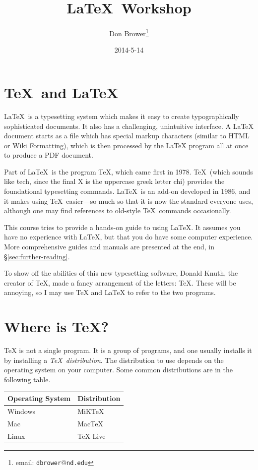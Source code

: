 \documentclass{article}
\begin{document}
\title{\LaTeX\ Workshop}
\author{Don Brower\thanks{email: \texttt{dbrower$@$nd.edu}}}
\date{2014-5-14}
\maketitle

\section{\TeX\ and \LaTeX}

\LaTeX\ is a typesetting system which makes it easy to create typographically sophisticated documents.
It also has a challenging, unintuitive interface.
A LaTeX document starts as a file which has special markup characters (similar to HTML or Wiki Formatting),
which is then processed by the LaTeX program all at once to produce a PDF document.

Part of \LaTeX\ is the program \TeX, which came first in 1978.
\TeX\ (which sounds like tech, since the final X is the uppercase greek letter chi) provides the foundational typesetting commands.
\LaTeX\ is an add-on developed in 1986, and it makes using \TeX\ easier---so much so that it
is now the standard everyone uses, although one may find references to old-style \TeX\ commands occasionally.

This course tries to provide a hands-on guide to using \LaTeX.
It assumes you have no experience with \LaTeX, but that you do have some computer experience.
More comprehensive guides and manuals are presented at the end, in \S\ref{sec:further-reading}.

To show off the abilities of this new typesetting software, Donald Knuth, the creator of \TeX, made
a fancy arrangement of the letters: \TeX.
These will be annoying, so I may use TeX and LaTeX to refer to the two programs.

\section{Where is \TeX?}

TeX is not a single program.
It is a group of programs, and one usually installs it by installing a \textit{\TeX\ distribution}.
The distribution to use depends on the operating system on your computer.
Some common distributions are in the following table.

\begin{center}
\begin{tabular}{ll}
    \toprule
    Operating System & Distribution \\
    \midrule
    Windows & MiKTeX \\
    Mac & MacTeX \\
    Linux & TeX Live \\
    \bottomrule
\end{tabular}
\end{center}
\end{document}
